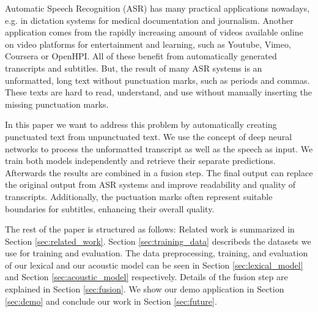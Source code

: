 Automatic Speech Recognition (ASR) has many practical applications nowadays, e.g. in dictation systems for medical documentation and journalism.
Another application comes from the rapidly increasing amount of videos available online on video platforms for entertainment and learning, such as Youtube, Vimeo, Coursera or OpenHPI.
All of these benefit from automatically generated transcripts and subtitles.
But, the result of many ASR systems is an unformatted, long text without punctuation marks, such as periods and commas.
These texts are hard to read, understand, and use without manually inserting the missing punctuation marks.

In this paper we want to address this problem by automatically creating punctuated text from unpunctuated text.
We use the concept of deep neural networks to process the unformatted transcript as well as the speech as input.
We train both models independently and retrieve their separate predictions.
Afterwards the results are combined in a fusion step.
The final output can replace the original output from ASR systems and improve readability and quality of transcripts.
Additionally, the puctuation marks often represent suitable boundaries for subtitles, enhancing their overall quality.

The rest of the paper is structured as follows:
Related work is summarized in Section \ref{sec:related_work}.
Section \ref{sec:training_data} describeds the datasets we use for training and evaluation.
The data preprocessing, training, and evaluation of our lexical and our acoustic model can be seen in Section \ref{sec:lexical_model} and Section \ref{sec:acoustic_model} respectively.
Details of the fusion step are explained in Section \ref{sec:fusion}.
We show our demo application in Section \ref{sec:demo} and conclude our work in Section \ref{sec:future}.
